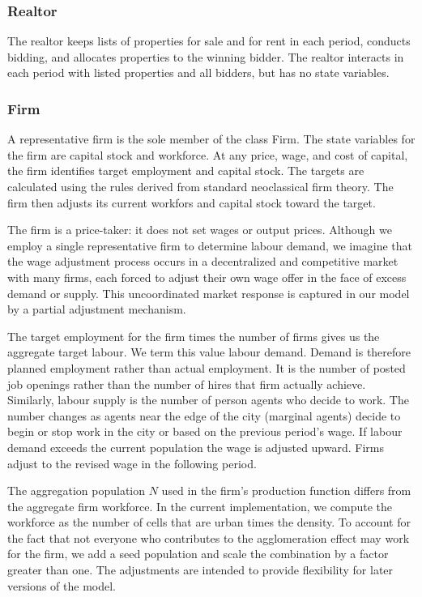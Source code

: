 \subsubsection{Realtor}
The realtor keeps lists of properties for sale and for rent in each period, conducts bidding, and allocates properties to the winning bidder. The realtor interacts in each period with listed properties and all bidders, but has no state variables.


\subsubsection{Firm}
A representative firm is the sole member of the class Firm. The state variables for the firm are capital stock and workforce. At any price, wage, and cost of capital, the firm identifies target employment and capital stock. The targets are calculated using the rules derived from standard neoclassical firm theory. The firm then adjusts its current workfors and capital stock toward the target. 

The firm  is a price-taker: it does not set wages or output prices. Although we employ a single representative firm to determine labour demand,  we imagine that the wage adjustment process occurs in a decentralized and competitive market with many firms, each forced to adjust their own wage offer in the face of excess demand or supply. This uncoordinated market response is captured in our model by a partial adjustment mechanism. 

The target employment for the firm times the number of firms gives us the aggregate target labour. We term this value labour demand.  Demand is therefore planned employment rather than actual employment.  It is the number of posted job openings rather than the number of hires that firm actually achieve.  %
Similarly, labour supply is the number of person agents who decide to work. The number changes as agents  near the edge of the city (marginal agents) decide to begin or stop work in the city or based on the previous period's wage. 
If labour demand exceeds the current population the wage is adjusted upward. Firms adjust to the revised wage in the following period.

The aggregation population $N$ used in the firm's production function differs from the aggregate firm workforce. In the current implementation, we compute the workforce as the number of cells that are urban times the density. To account for the fact that not everyone who contributes to the agglomeration effect may work for the firm, we add a seed population and scale the combination by a factor greater than one. The adjustments are intended to provide flexibility for later versions of the model.
     
